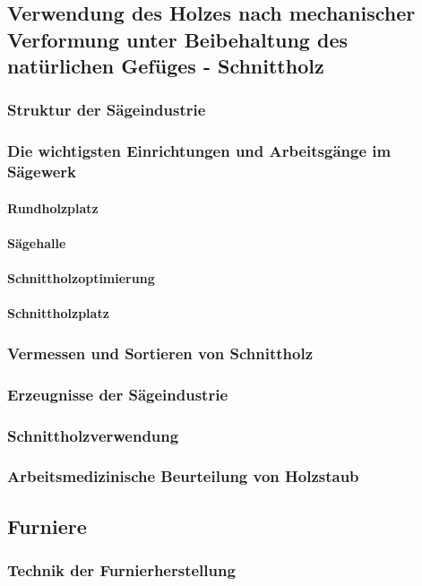 \documentclass[12pt]{article}
\begin{document}
\subsection{Verwendung des Holzes nach mechanischer Verformung unter Beibehaltung des natürlichen Gefüges - Schnittholz}
\subsubsection{Struktur der Sägeindustrie}
\subsubsection{Die wichtigsten Einrichtungen und Arbeitsgänge im Sägewerk}
\paragraph{Rundholzplatz}
\paragraph{Sägehalle}
\paragraph{Schnittholzoptimierung}
\paragraph{Schnittholzplatz}
\subsubsection{Vermessen und Sortieren von Schnittholz}
\subsubsection{Erzeugnisse der Sägeindustrie}
\subsubsection{Schnittholzverwendung}
\subsubsection{Arbeitsmedizinische Beurteilung von Holzstaub}
\subsection{Furniere}
\subsubsection{Technik der Furnierherstellung}
\end{document}
